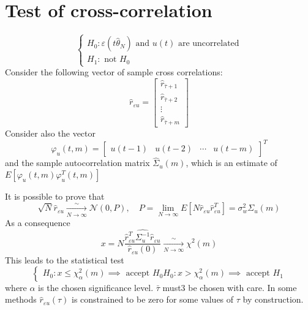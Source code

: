 \documentclass{book}
\begin{document}
\section{Test of cross-correlation}
\[
    \begin{cases}
        H_0: \varepsilon(t\hat{\theta}_N) \text{ and } u(t) \text{ are uncorrelated}\\
        H_1: \text{ not } H_0
    \end{cases}
\]
Consider the following vector of sample cross correlations:
\[
    \hat{r}_{\varepsilon u} = \begin{bmatrix}
        \hat{r}_{\bar{\tau}+1} \\
        \hat{r}_{\bar{\tau}+2} \\
        \vdots\\
        \hat{r}_{\bar{\tau}+m} 
    \end{bmatrix}
\]
Consider also the vector
\[
    \varphi_u(t,m) = \begin{bmatrix}
        u(t-1) & u(t-2) & \cdots & u(t-m)
    \end{bmatrix}^T
\]
and the sample autocorrelation matrix $\hat{\Sigma}_u(m)$, which is an estimate of $E[\varphi_u(t,m)\varphi_u^T(t,m)]$

It is possible to prove that 
\[
    \sqrt{N}\hat{r}_{\varepsilon u}\xrightarrow[N\to\infty] \sim \mathcal{N}(0,P), \quad P= \lim_{N\to\infty}E[N\hat{r}_{\varepsilon u}\hat{r}_{\varepsilon u}^T]=\sigma_w^2\Sigma_u(m)
\]
As a consequence
\[
    x=N\displaystyle\frac{\hat{r}_{\varepsilon u}^T\hat{\Sigma_u^{-1}}\hat{r}_{\varepsilon u}}{\hat{r}_{\varepsilon u}(0)}\xrightarrow[N\to\infty]\sim\chi^2(m)
\]
This leads to the statistical test
\[
    \begin{cases}
        H_0 : x \leq \chi^2_\alpha(m) \implies \text{ accept } H_0
        H_0 : x >\chi^2_\alpha(m) \implies \text{ accept } H_1
    \end{cases}
\]
where $\alpha$ is the chosen significance level. $\bar{\tau}$ must3 be chosen with care. In some methods  $\hat{r}_{\varepsilon u}(\tau)$ is constrained to be zero for some values of $\tau$ by construction.
\end{document}
